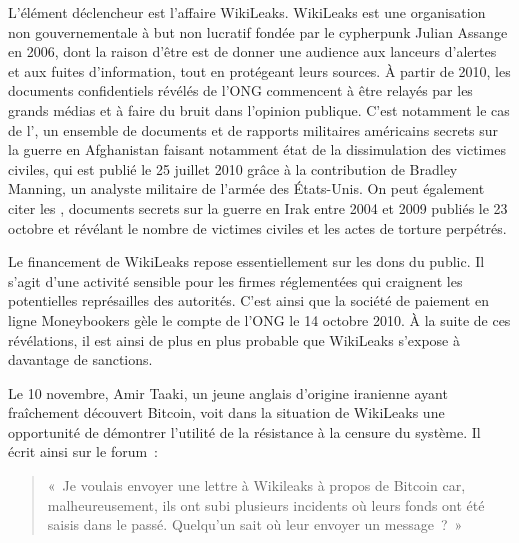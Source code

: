 L'élément déclencheur est l'affaire WikiLeaks. WikiLeaks est une organisation non gouvernementale à but non lucratif fondée par le cypherpunk Julian Assange en 2006, dont la raison d'être est de donner une audience aux lanceurs d'alertes et aux fuites d'information, tout en protégeant leurs sources. À partir de 2010, les documents confidentiels révélés de l'ONG commencent à être relayés par les grands médias et à faire du bruit dans l'opinion publique. C'est notamment le cas de l', un ensemble de documents et de rapports militaires américains secrets sur la guerre en Afghanistan faisant notamment état de la dissimulation des victimes civiles, qui est publié le 25 juillet 2010 grâce à la contribution de Bradley Manning, un analyste militaire de l'armée des États-Unis. On peut également citer les , documents secrets sur la guerre en Irak entre 2004 et 2009 publiés le 23 octobre et révélant le nombre de victimes civiles et les actes de torture perpétrés. %

Le financement de WikiLeaks repose essentiellement sur les dons du public. Il s'agit d'une activité sensible pour les firmes réglementées qui craignent les potentielles représailles des autorités. C'est ainsi que la société de paiement en ligne Moneybookers gèle le compte de l'ONG le 14 octobre 2010. À la suite de ces révélations, il est ainsi de plus en plus probable que WikiLeaks s'expose à davantage de sanctions.

Le 10 novembre, Amir Taaki, un jeune anglais d'origine iranienne ayant fraîchement découvert Bitcoin, voit dans la situation de WikiLeaks une opportunité de démontrer l'utilité de la résistance à la censure du système. Il écrit ainsi sur le forum~:

\begin{quote}
«~Je voulais envoyer une lettre à Wikileaks à propos de Bitcoin car, malheureusement, ils ont subi plusieurs incidents où leurs fonds ont été saisis dans le passé. Quelqu'un sait où leur envoyer un message~?~»
\end{quote}

